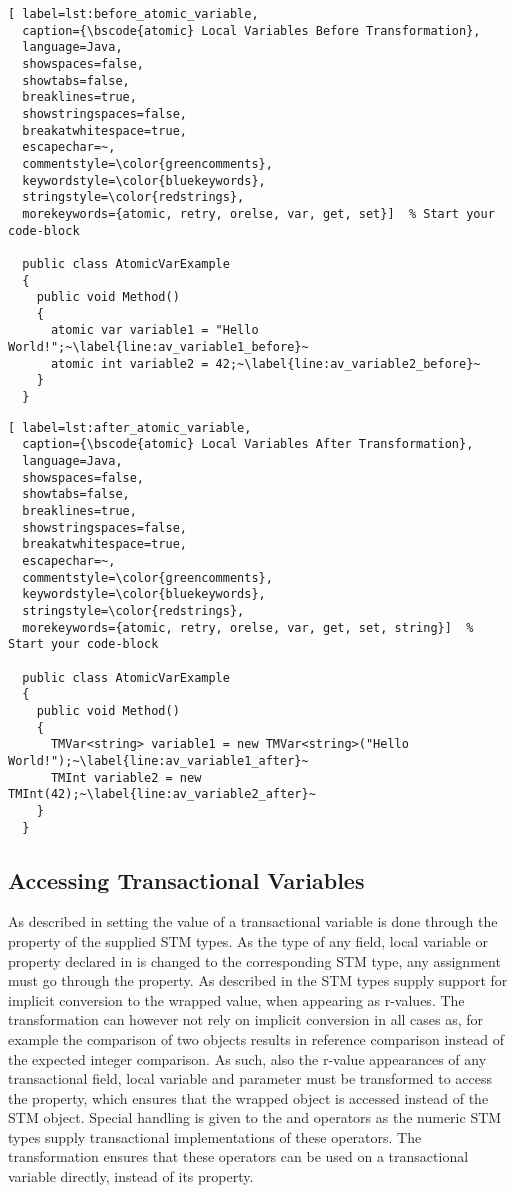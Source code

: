 \begin{lstlisting}[ label=lst:before_atomic_variable,
  caption={\bscode{atomic} Local Variables Before Transformation},
  language=Java,  
  showspaces=false,
  showtabs=false,
  breaklines=true,
  showstringspaces=false,
  breakatwhitespace=true,
  escapechar=~,
  commentstyle=\color{greencomments},
  keywordstyle=\color{bluekeywords},
  stringstyle=\color{redstrings},
  morekeywords={atomic, retry, orelse, var, get, set}]  % Start your code-block

  public class AtomicVarExample
  {
    public void Method()
    {
      atomic var variable1 = "Hello World!";~\label{line:av_variable1_before}~
      atomic int variable2 = 42;~\label{line:av_variable2_before}~
    }
  }
\end{lstlisting}

\begin{lstlisting}[ label=lst:after_atomic_variable,
  caption={\bscode{atomic} Local Variables After Transformation},
  language=Java,  
  showspaces=false,
  showtabs=false,
  breaklines=true,
  showstringspaces=false,
  breakatwhitespace=true,
  escapechar=~,
  commentstyle=\color{greencomments},
  keywordstyle=\color{bluekeywords},
  stringstyle=\color{redstrings},
  morekeywords={atomic, retry, orelse, var, get, set, string}]  % Start your code-block

  public class AtomicVarExample
  {
    public void Method()
    {
      TMVar<string> variable1 = new TMVar<string>("Hello World!");~\label{line:av_variable1_after}~
      TMInt variable2 = new TMInt(42);~\label{line:av_variable2_after}~
    }
  }
\end{lstlisting}


\subsection{Accessing Transactional Variables}
\label{subsec:roslyn_extension_accessing_variables}
As described in  setting the value of a transactional variable is done through the  property of the supplied \ac{STM} types. As the type of any field, local variable or property declared  in \stmnamesp is changed to the corresponding \ac{STM} type, any assignment must go through the  property. As described in  the \ac{STM} types supply support for implicit conversion to the wrapped value, when appearing as r-values. The transformation can however not rely on implicit conversion in all cases as, for example the comparison of two  objects results in reference comparison instead of the expected integer comparison. As such, also the r-value appearances of any transactional field, local variable and parameter must be transformed to access the  property, which ensures that the wrapped object is accessed instead of the \ac{STM} object. Special handling is given to the \bscode{++} and \bscode{--} operators as the numeric \ac{STM} types supply transactional implementations of these operators. The transformation ensures that these operators can be used on a transactional variable directly, instead of its  property.

